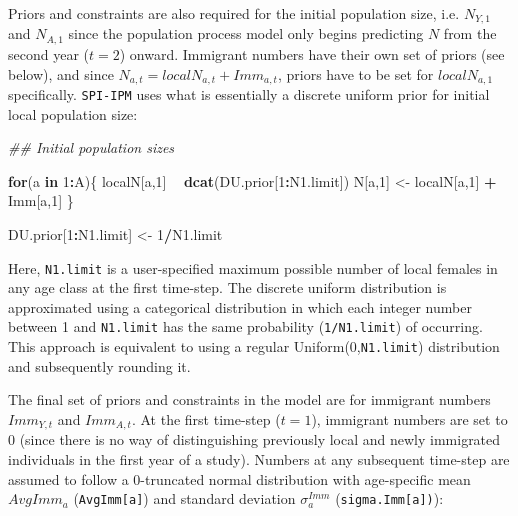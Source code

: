 \documentclass[
]{book}
\newenvironment{Shaded}{\begin{snugshade}}{\end{snugshade}}
\newcommand{\CommentTok}[1]{\textcolor[rgb]{0.56,0.35,0.01}{\textit{#1}}}
\newcommand{\ControlFlowTok}[1]{\textcolor[rgb]{0.13,0.29,0.53}{\textbf{#1}}}
\newcommand{\DecValTok}[1]{\textcolor[rgb]{0.00,0.00,0.81}{#1}}
\newcommand{\KeywordTok}[1]{\textcolor[rgb]{0.13,0.29,0.53}{\textbf{#1}}}
\newcommand{\NormalTok}[1]{#1}
\newcommand{\OperatorTok}[1]{\textcolor[rgb]{0.81,0.36,0.00}{\textbf{#1}}}
\newcommand{\StringTok}[1]{\textcolor[rgb]{0.31,0.60,0.02}{#1}}
\begin{document}
Priors and constraints are also required for the initial population size, i.e.
\(N_{Y,1}\) and \(N_{A,1}\) since the population process model only begins
predicting \(N\) from the second year (\(t=2\)) onward. Immigrant numbers have their
own set of priors (see below), and since \(N_{a,t} = localN_{a,t} + Imm_{a,t}\),
priors have to be set for \(localN_{a,1}\) specifically. \texttt{SPI-IPM} uses what is
essentially a discrete uniform prior for initial local population size:

\begin{Shaded}
\begin{Highlighting}[]
     \CommentTok{## Initial population sizes}

     \ControlFlowTok{for}\NormalTok{(a }\ControlFlowTok{in} \DecValTok{1}\OperatorTok{:}\NormalTok{A)\{}
\NormalTok{        localN[a,}\DecValTok{1}\NormalTok{] }\OperatorTok{~}\StringTok{ }\KeywordTok{dcat}\NormalTok{(DU.prior[}\DecValTok{1}\OperatorTok{:}\NormalTok{N1.limit])}
\NormalTok{      N[a,}\DecValTok{1}\NormalTok{] <-}\StringTok{ }\NormalTok{localN[a,}\DecValTok{1}\NormalTok{] }\OperatorTok{+}\StringTok{ }\NormalTok{Imm[a,}\DecValTok{1}\NormalTok{]}
\NormalTok{     \}}

\NormalTok{     DU.prior[}\DecValTok{1}\OperatorTok{:}\NormalTok{N1.limit] <-}\StringTok{ }\DecValTok{1}\OperatorTok{/}\NormalTok{N1.limit}
\end{Highlighting}
\end{Shaded}

Here, \texttt{N1.limit} is a user-specified maximum possible number of local females in
any age class at the first time-step. The discrete uniform distribution is
approximated using a categorical distribution in which each integer number between
1 and \texttt{N1.limit} has the same probability (\texttt{1/N1.limit}) of occurring.
This approach is equivalent to using a regular Uniform(0,\texttt{N1.limit}) distribution
and subsequently rounding it.

The final set of priors and constraints in the model are for immigrant numbers
\(Imm_{Y,t}\) and \(Imm_{A,t}\). At the first time-step (\(t=1\)), immigrant numbers
are set to 0 (since there is no way of distinguishing previously local and
newly immigrated individuals in the first year of a study). Numbers at any
subsequent time-step are assumed to follow a 0-truncated normal distribution
with age-specific mean \(AvgImm_a\) (\texttt{AvgImm{[}a{]}}) and standard deviation
\(\sigma_a^{Imm}\) (\texttt{sigma.Imm{[}a{]})}):
\end{document}
